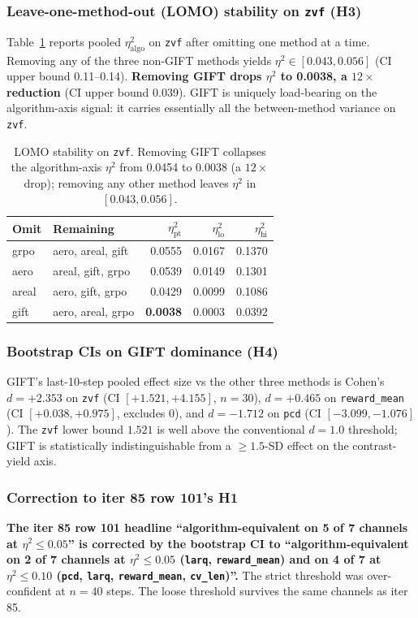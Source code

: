 \subsubsection{Leave-one-method-out (LOMO) stability on \texttt{zvf} (H3)}
\label{sec:p5-iter89-h3}
Table~\ref{tab:p5-iter89-lomo} reports pooled $\eta^2_{\mathrm{algo}}$
on \texttt{zvf} after omitting one method at a time. Removing any of
the three non-GIFT methods yields $\eta^2 \in [0.043, 0.056]$ (CI
upper bound 0.11--0.14). \textbf{Removing GIFT drops $\eta^2$ to
0.0038, a $12\times$ reduction} (CI upper bound 0.039). GIFT is
uniquely load-bearing on the algorithm-axis signal: it carries
essentially all the between-method variance on \texttt{zvf}.

\begin{table}[ht]
\centering\small
\begin{tabular}{llrrr}
\toprule
Omit & Remaining & $\eta^2_{\mathrm{pt}}$ & $\eta^2_{\mathrm{lo}}$ & $\eta^2_{\mathrm{hi}}$ \\
\midrule
grpo  & aero, areal, gift & 0.0555 & 0.0167 & 0.1370 \\
aero  & areal, gift, grpo & 0.0539 & 0.0149 & 0.1301 \\
areal & aero, gift, grpo  & 0.0429 & 0.0099 & 0.1086 \\
gift  & aero, areal, grpo & \textbf{0.0038} & 0.0003 & 0.0392 \\
\bottomrule
\end{tabular}
\caption{LOMO stability on \texttt{zvf}. Removing GIFT collapses the
algorithm-axis $\eta^2$ from 0.0454 to 0.0038 (a $12\times$ drop);
removing any other method leaves $\eta^2$ in $[0.043, 0.056]$.}
\label{tab:p5-iter89-lomo}
\end{table}

\subsubsection{Bootstrap CIs on GIFT dominance (H4)}
\label{sec:p5-iter89-h4}
GIFT's last-10-step pooled effect size vs the other three methods is
Cohen's $d{=}+2.353$ on \texttt{zvf} (CI $[+1.521, +4.155]$,
$n{=}30$), $d{=}+0.465$ on \texttt{reward\_mean} (CI $[+0.038,
+0.975]$, excludes 0), and $d{=}-1.712$ on \texttt{pcd} (CI
$[-3.099, -1.076]$). The \texttt{zvf} lower bound $1.521$ is well
above the conventional $d{=}1.0$ threshold; GIFT is statistically
indistinguishable from a $\geq 1.5$-SD effect on the contrast-yield
axis.

\subsubsection{Correction to iter 85 row 101's H1}
\label{sec:p5-iter89-correction}
\textbf{The iter 85 row 101 headline ``algorithm-equivalent on 5 of 7
channels at $\eta^2 \leq 0.05$'' is corrected by the bootstrap CI
to ``algorithm-equivalent on 2 of 7 channels at $\eta^2 \leq 0.05$
(\texttt{larq}, \texttt{reward\_mean}) and on 4 of 7 at
$\eta^2 \leq 0.10$ (\texttt{pcd}, \texttt{larq},
\texttt{reward\_mean}, \texttt{cv\_len})''.} The strict threshold
was over-confident at $n{=}40$ steps. The loose threshold survives
the same channels as iter 85.

